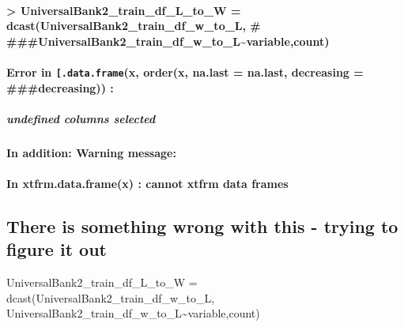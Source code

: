 \documentclass[
]{article}
\begin{document}
\hypertarget{universalbank2_train_df_l_to_w-dcastuniversalbank2_train_df_w_to_l-universalbank2_train_df_w_to_lvariablecount}{%
\paragraph{\textgreater{} UniversalBank2\_train\_df\_L\_to\_W =
dcast(UniversalBank2\_train\_df\_w\_to\_L, \#
\#\#\#UniversalBank2\_train\_df\_w\_to\_L\textasciitilde variable,count)}\label{universalbank2_train_df_l_to_w-dcastuniversalbank2_train_df_w_to_l-universalbank2_train_df_w_to_lvariablecount}}

\hypertarget{error-in-.data.framex-orderx-na.last-na.last-decreasing-decreasing}{%
\paragraph{\texorpdfstring{Error in \texttt{{[}.data.frame}(x, order(x,
na.last = na.last, decreasing = \#\#\#decreasing))
:}{Error in {[}.data.frame(x, order(x, na.last = na.last, decreasing = \#\#\#decreasing)) :}}\label{error-in-.data.framex-orderx-na.last-na.last-decreasing-decreasing}}

\hypertarget{undefined-columns-selected}{%
\subparagraph{undefined columns
selected}\label{undefined-columns-selected}}

\hypertarget{in-addition-warning-message-1}{%
\paragraph{In addition: Warning
message:}\label{in-addition-warning-message-1}}

\hypertarget{in-xtfrm.data.framex-cannot-xtfrm-data-frames-1}{%
\paragraph{In xtfrm.data.frame(x) : cannot xtfrm data
frames}\label{in-xtfrm.data.framex-cannot-xtfrm-data-frames-1}}

\hypertarget{there-is-something-wrong-with-this---trying-to-figure-it-out}{%
\subsection{There is something wrong with this - trying to figure it
out}\label{there-is-something-wrong-with-this---trying-to-figure-it-out}}

UniversalBank2\_train\_df\_L\_to\_W =
dcast(UniversalBank2\_train\_df\_w\_to\_L,
UniversalBank2\_train\_df\_w\_to\_L\textasciitilde variable,count)
\end{document}

